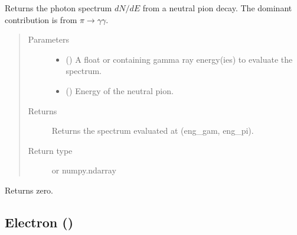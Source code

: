 \documentclass[letterpaper,10pt,english]{sphinxmanual}
\begin{document}
\begin{fulllineitems}
\label{\detokenize{Modules:neutral_pion.decay_spectra}}
Returns the photon spectrum \(dN/dE\) from a neutral pion decay. The dominant contribution is from \(\pi\to\gamma\gamma\).
\begin{quote}\begin{description}
\item[{Parameters}] \leavevmode\begin{itemize}
\item {} 
 () \textendash{} A float or  containing gamma ray energy(ies) to evaluate the spectrum.

\item {} 
 () \textendash{} Energy of the neutral pion.

\end{itemize}

\item[{Returns}] \leavevmode
Returns the spectrum evaluated at (eng\_gam, eng\_pi).

\item[{Return type}] \leavevmode
{} or numpy.ndarray

\end{description}\end{quote}

\end{fulllineitems}


\begin{fulllineitems}
Returns zero.

\end{fulllineitems}



\subsection{Electron ()}
\label{\detokenize{Modules:electron-hazma-particles-electron}}
\end{document}
